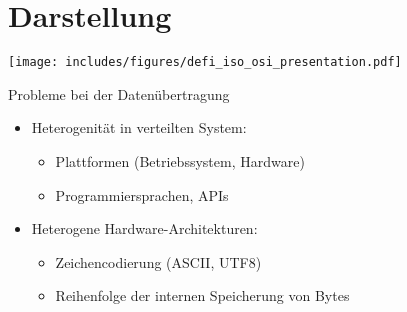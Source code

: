 \section{Darstellung}

\texttt{[image: includes/figures/defi\_iso\_osi\_presentation.pdf]}

\begin{bonus}{Probleme bei der Datenübertragung}
    \begin{itemize}
        \item Heterogenität in verteilten System:
              
              \begin{itemize}
                  \item Plattformen (Betriebssystem, Hardware)
                  \item Programmiersprachen, APIs
              \end{itemize}
        \item Heterogene Hardware-Architekturen:
              
              \begin{itemize}
                  \item Zeichencodierung (ASCII, UTF8)
                  \item Reihenfolge der internen Speicherung von Bytes
              \end{itemize}
    \end{itemize}
\end{bonus}

